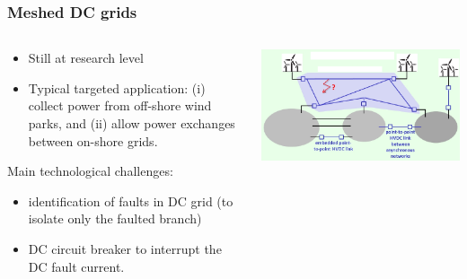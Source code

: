 \begin{frame}
\frametitle{Meshed DC grids}
\begin{columns}
\begin{column}{0.5\linewidth}
\begin{itemize}
    \item Still at research level
    \item Typical targeted application: (i) collect power from off-shore wind parks, and (ii) allow power exchanges between on-shore grids.
\end{itemize}
Main technological challenges:
\begin{itemize}
    \item identification of faults in DC grid (to isolate only the faulted branch)
    \item DC circuit breaker to interrupt the DC fault current.
\end{itemize}
\end{column}
\begin{column}{0.5\linewidth}
\begin{center}
    \includegraphics[width=0.8\linewidth]{images/supergrid.png}
\end{center}
\end{column}
\end{columns}
\end{frame}



